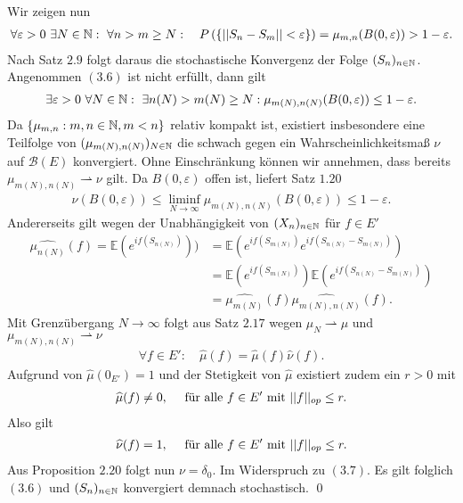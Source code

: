 \begin{proof*}
    Wir zeigen nun
    \begin{align}
        \forall \varepsilon > 0 \ \exists N \in \mathbb{N}: \ \forall n > m \geq N: \quad P\left(\left\{ \lvert\lvert S_n - S_m \rvert\rvert < \varepsilon \right\}\right) = \mu_{m,n}(B(0,\varepsilon)) > 1 - \varepsilon.
    \end{align}
    Nach Satz $2.9$ folgt daraus die stochastische Konvergenz der Folge $(S_n)_{n \in \mathbb{N}}$. Angenommen $(3.6)$ ist nicht erfüllt, dann gilt
    \begin{align*}
        \exists \varepsilon > 0 \ \forall N \in \mathbb{N}: \ \exists n(N) > m(N) \geq N: \mu_{m(N), n(N)}(B(0, \varepsilon)) \leq 1 - \varepsilon.
    \end{align*}
    Da $\{\mu_{m,n}: m,n \in \mathbb{N}, m < n \}$ relativ kompakt ist, existiert insbesondere eine Teilfolge von $(\mu_{m(N),n(N)})_{N \in \mathbb{N}}$ die schwach gegen ein Wahrscheinlichkeitsmaß $\nu$ auf $\mathcal{B}(E)$ konvergiert.
    Ohne Einschränkung können wir annehmen, dass bereits $\mu_{m(N),n(N)} \rightharpoonup \nu$ gilt. Da $B(0, \varepsilon)$ offen ist, liefert Satz $1.20$
    \begin{align}
        \nu(B(0, \varepsilon)) \leq \liminf_{N \to \infty}\mu_{m(N),n(N)}(B(0,\varepsilon)) \leq 1 - \varepsilon. 
    \end{align}
    Andererseits gilt wegen der Unabhängigkeit von $(X_n)_{n \in \mathbb{N}}$ für $f \in E'$
    \begin{align*}
        \widehat{\mu_{n(N)}}(f) = \mathbb{E}(e^{if(S_{n(N)})})) &= \mathbb{E}(e^{if(S_{m(N)})}e^{if(S_{n(N)} - S_{m(N)})}) \\\
                                                   &= \mathbb{E}(e^{if(S_{m(N)})})\mathbb{E}(e^{if(S_{n(N)} - S_{m(N)})}) \\\
                                                   &= \widehat{\mu_{m(N)}}(f)\widehat{\mu_{m(N),n(N)}}(f). 
    \end{align*}
    Mit Grenzübergang $N \to \infty$ folgt aus Satz $2.17$ wegen $\mu_N \rightharpoonup \mu$ und $\mu_{m(N),n(N)} \rightharpoonup \nu$ 
    \begin{align*}
        \forall f \in E': \quad \widehat{\mu}(f) = \widehat{\mu}(f) \widehat{\nu}(f).
    \end{align*}
    Aufgrund von $\widehat{\mu}(0_{E'}) = 1$ und der Stetigkeit von $\widehat{\mu}$ existiert zudem ein $r>0$ mit 
    \begin{align*}
        \widehat{\mu}(f) \neq 0, \quad \text{ für alle } f \in E' \text{ mit } \lvert\lvert f \rvert\rvert_{op} \leq r. 
    \end{align*}
    Also gilt 
    \begin{align*}
        \widehat{\nu}(f) = 1, \quad \text{ für alle } f \in E' \text{ mit } \lvert\lvert f \rvert\rvert_{op} \leq r. 
    \end{align*}
    Aus Proposition $2.20$ folgt nun $\nu = \delta_0$. Im Widerspruch zu $(3.7)$. Es gilt folglich $(3.6)$ und $(S_n)_{n \in \mathbb{N}}$ konvergiert demnach stochastisch. 
    \qed
\end{proof*}

